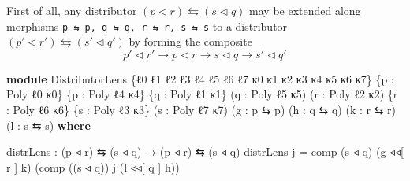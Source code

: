 \documentclass[
  11pt,
  oneside,
  article]{memoir}
\newenvironment{Shaded}{}{}
\newcommand{\KeywordTok}[1]{\textcolor[rgb]{0.00,0.44,0.13}{\textbf{#1}}}
\newcommand{\NormalTok}[1]{#1}
\newcommand{\OtherTok}[1]{\textcolor[rgb]{0.00,0.44,0.13}{#1}}
\theoremstyle{definition}
\theoremstyle{plain}
\newcommand{\0}{\textsf{0}}
\newcommand{\1}{\tn{\textsf{1}}}
\begin{document}
First of all, any distributor
\((p \triangleleft r) \leftrightarrows (s \triangleleft q)\) may be
extended along morphisms
\texttt{p\textquotesingle{}\ ⇆\ p,\ q\ ⇆\ q\textquotesingle{},\ r\textquotesingle{}\ ⇆\ r,\ s\ ⇆\ s\textquotesingle{}}
to a distributor
\((p' \triangleleft r') \leftrightarrows (s' \triangleleft q')\) by
forming the composite \[
p' \triangleleft r' \xrightarrow{} p \triangleleft r \xrightarrow{} s \triangleleft q \xrightarrow{} s' \triangleleft q'
\]

\begin{Shaded}
\begin{Highlighting}[]
\KeywordTok{module}\NormalTok{ DistributorLens }\OtherTok{\{}\NormalTok{ℓ0 ℓ1 ℓ2 ℓ3 ℓ4 ℓ5 ℓ6 ℓ7}
\NormalTok{                        κ0 κ1 κ2 κ3 κ4 κ5 κ6 κ7}\OtherTok{\}}
                       \OtherTok{\{}\NormalTok{p }\OtherTok{:}\NormalTok{ Poly ℓ0 κ0}\OtherTok{\}} \OtherTok{\{}\NormalTok{p\textquotesingle{} }\OtherTok{:}\NormalTok{ Poly ℓ4 κ4}\OtherTok{\}}
                       \OtherTok{\{}\NormalTok{q }\OtherTok{:}\NormalTok{ Poly ℓ1 κ1}\OtherTok{\}} \OtherTok{(}\NormalTok{q\textquotesingle{} }\OtherTok{:}\NormalTok{ Poly ℓ5 κ5}\OtherTok{)}
                       \OtherTok{(}\NormalTok{r }\OtherTok{:}\NormalTok{ Poly ℓ2 κ2}\OtherTok{)} \OtherTok{\{}\NormalTok{r\textquotesingle{} }\OtherTok{:}\NormalTok{ Poly ℓ6 κ6}\OtherTok{\}}
                       \OtherTok{\{}\NormalTok{s }\OtherTok{:}\NormalTok{ Poly ℓ3 κ3}\OtherTok{\}} \OtherTok{(}\NormalTok{s\textquotesingle{} }\OtherTok{:}\NormalTok{ Poly ℓ7 κ7}\OtherTok{)}
                       \OtherTok{(}\NormalTok{g }\OtherTok{:}\NormalTok{ p\textquotesingle{} ⇆ p}\OtherTok{)} \OtherTok{(}\NormalTok{h }\OtherTok{:}\NormalTok{ q ⇆ q\textquotesingle{}}\OtherTok{)} 
                       \OtherTok{(}\NormalTok{k }\OtherTok{:}\NormalTok{ r\textquotesingle{} ⇆ r}\OtherTok{)} \OtherTok{(}\NormalTok{l }\OtherTok{:}\NormalTok{ s ⇆ s\textquotesingle{}}\OtherTok{)} \KeywordTok{where}

\NormalTok{    distrLens }\OtherTok{:} \OtherTok{(}\NormalTok{p ◃ r}\OtherTok{)}\NormalTok{ ⇆ }\OtherTok{(}\NormalTok{s ◃ q}\OtherTok{)} \OtherTok{→} \OtherTok{(}\NormalTok{p\textquotesingle{} ◃ r\textquotesingle{}}\OtherTok{)}\NormalTok{ ⇆ }\OtherTok{(}\NormalTok{s\textquotesingle{} ◃ q\textquotesingle{}}\OtherTok{)}
\NormalTok{    distrLens j }\OtherTok{=} 
\NormalTok{        comp }\OtherTok{(}\NormalTok{s\textquotesingle{} ◃ q\textquotesingle{}}\OtherTok{)} \OtherTok{(}\NormalTok{g ◃◃[ r ] k}\OtherTok{)} 
             \OtherTok{(}\NormalTok{comp }\OtherTok{((}\NormalTok{s\textquotesingle{} ◃ q\textquotesingle{}}\OtherTok{))}\NormalTok{ j }
                   \OtherTok{(}\NormalTok{l ◃◃[ q\textquotesingle{} ] h}\OtherTok{))}
\end{Highlighting}
\end{Shaded}
\end{document}
